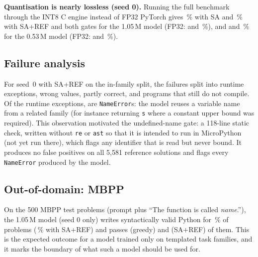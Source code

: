 \textbf{Quantisation is nearly lossless (seed 0).} Running the full benchmark through the INT8 C engine instead of FP32 PyTorch gives \ablIntanchorpass\,\% with SA and \ablIntareflintpass\,\% with SA+REF and both gates for the 1.05\,M model (FP32: \ablFinalanchorpass{} and \ablFinalareflintpass\,\%), and \ablSmallintanchorpass{} and \ablSmallintareflintpass\,\% for the 0.53\,M model (FP32: \ablSmallanchorpass{} and \ablSmallareflintpass\,\%).

\subsection{Failure analysis}\label{sec:fail}
For seed~0 with SA+REF on the in-family split, the \failidtotal{} failures split into \failidruntime{} runtime exceptions, \failidwrong{} wrong values, \failidpartly{} partly correct, and \failidsyntax{} programs that still do not compile. Of the runtime exceptions, \failidnameerr{} are \texttt{NameError}s: the model reuses a variable name from a related family (for instance returning \texttt{s} where a constant upper bound was required). This observation motivated the undefined-name gate: a 118-line static check, written without \texttt{re} or \texttt{ast} so that it is intended to run in MicroPython (not yet run there), which flags any identifier that is read but never bound. It produces no false positives on all 5{,}581 reference solutions and flags every \texttt{NameError} produced by the model.

\subsection{Out-of-domain: MBPP}
On the 500 MBPP test problems (prompt plus ``The function is called \textit{name}.''), the 1.05\,M model (seed 0 only) writes syntactically valid Python for \mbppgreedyvalid\,\% of problems (\mbpparefvalid\,\% with SA+REF) and passes \mbppgreedypassed{} (greedy) and \mbpparefpassed{} (SA+REF) of them. This is the expected outcome for a model trained only on \nfamtrain{} templated task families, and it marks the boundary of what such a model should be used for.

